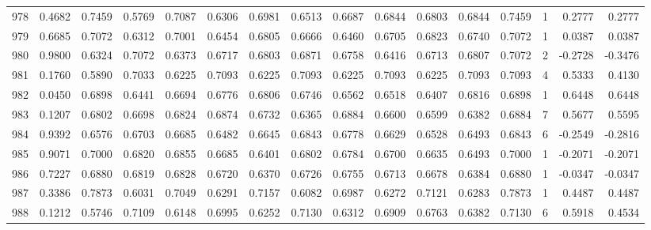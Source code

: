 \begin{tabular}{lrrrrrrrrrrrrrrr}
978 &      0.4682 &  0.7459 &  0.5769 &  0.7087 &  0.6306 &  0.6981 &  0.6513 &  0.6687 &  0.6844 &  0.6803 &   0.6844 &     0.7459 &      1 &                    0.2777 &                     0.2777 \\
979 &      0.6685 &  0.7072 &  0.6312 &  0.7001 &  0.6454 &  0.6805 &  0.6666 &  0.6460 &  0.6705 &  0.6823 &   0.6740 &     0.7072 &      1 &                    0.0387 &                     0.0387 \\
980 &      0.9800 &  0.6324 &  0.7072 &  0.6373 &  0.6717 &  0.6803 &  0.6871 &  0.6758 &  0.6416 &  0.6713 &   0.6807 &     0.7072 &      2 &                   -0.2728 &                    -0.3476 \\
981 &      0.1760 &  0.5890 &  0.7033 &  0.6225 &  0.7093 &  0.6225 &  0.7093 &  0.6225 &  0.7093 &  0.6225 &   0.7093 &     0.7093 &      4 &                    0.5333 &                     0.4130 \\
982 &      0.0450 &  0.6898 &  0.6441 &  0.6694 &  0.6776 &  0.6806 &  0.6746 &  0.6562 &  0.6518 &  0.6407 &   0.6816 &     0.6898 &      1 &                    0.6448 &                     0.6448 \\
983 &      0.1207 &  0.6802 &  0.6698 &  0.6824 &  0.6874 &  0.6732 &  0.6365 &  0.6884 &  0.6600 &  0.6599 &   0.6382 &     0.6884 &      7 &                    0.5677 &                     0.5595 \\
984 &      0.9392 &  0.6576 &  0.6703 &  0.6685 &  0.6482 &  0.6645 &  0.6843 &  0.6778 &  0.6629 &  0.6528 &   0.6493 &     0.6843 &      6 &                   -0.2549 &                    -0.2816 \\
985 &      0.9071 &  0.7000 &  0.6820 &  0.6855 &  0.6685 &  0.6401 &  0.6802 &  0.6784 &  0.6700 &  0.6635 &   0.6493 &     0.7000 &      1 &                   -0.2071 &                    -0.2071 \\
986 &      0.7227 &  0.6880 &  0.6819 &  0.6828 &  0.6720 &  0.6370 &  0.6726 &  0.6755 &  0.6713 &  0.6678 &   0.6384 &     0.6880 &      1 &                   -0.0347 &                    -0.0347 \\
987 &      0.3386 &  0.7873 &  0.6031 &  0.7049 &  0.6291 &  0.7157 &  0.6082 &  0.6987 &  0.6272 &  0.7121 &   0.6283 &     0.7873 &      1 &                    0.4487 &                     0.4487 \\
988 &      0.1212 &  0.5746 &  0.7109 &  0.6148 &  0.6995 &  0.6252 &  0.7130 &  0.6312 &  0.6909 &  0.6763 &   0.6382 &     0.7130 &      6 &                    0.5918 &                     0.4534 \\

\end{tabular}
